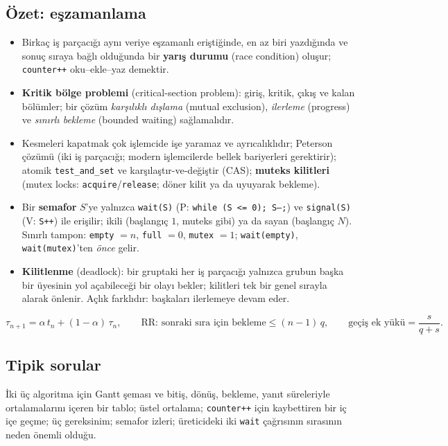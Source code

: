 \documentclass[11pt,a4paper]{article}
\newcommand{\term}[1]{\textbf{\color{mintdeep}#1}}
\begin{document}
\subsection*{Özet: eşzamanlama}
\begin{itemize}
  \item Birkaç iş parçacığı aynı veriye eşzamanlı eriştiğinde, en az biri yazdığında ve sonuç sıraya bağlı olduğunda bir \term{yarış durumu} (race condition) oluşur; \texttt{counter++} oku--ekle--yaz demektir.
  \item \term{Kritik bölge problemi} (critical-section problem): giriş, kritik, çıkış ve kalan bölümler; bir çözüm \emph{karşılıklı dışlama} (mutual exclusion), \emph{ilerleme} (progress) ve \emph{sınırlı bekleme} (bounded waiting) sağlamalıdır.
  \item Kesmeleri kapatmak çok işlemcide işe yaramaz ve ayrıcalıklıdır; Peterson çözümü (iki iş parçacığı; modern işlemcilerde bellek bariyerleri gerektirir); atomik \texttt{test\_and\_set} ve karşılaştır-ve-değiştir (CAS); \term{muteks kilitleri} (mutex locks: \texttt{acquire}/\texttt{release}; döner kilit ya da uyuyarak bekleme).
  \item Bir \term{semafor} $S$'ye yalnızca \texttt{wait(S)} (P: \texttt{while (S <= 0); S--;}) ve \texttt{signal(S)} (V: \texttt{S++}) ile erişilir; ikili (başlangıç $1$, muteks gibi) ya da sayan (başlangıç $N$). Sınırlı tampon: \texttt{empty} $= n$, \texttt{full} $= 0$, \texttt{mutex} $= 1$; \texttt{wait(empty)}, \texttt{wait(mutex)}'ten \emph{önce} gelir.
  \item \term{Kilitlenme} (deadlock): bir gruptaki her iş parçacığı yalnızca grubun başka bir üyesinin yol açabileceği bir olayı bekler; kilitleri tek bir genel sırayla alarak önlenir. Açlık farklıdır: başkaları ilerlemeye devam eder.
\end{itemize}

\begin{keyidea}
\[
\tau_{n+1} = \alpha\, t_n + (1-\alpha)\, \tau_n, \qquad
\text{RR: sonraki sıra için bekleme} \le (n-1)\,q, \qquad
\text{geçiş ek yükü} = \frac{s}{q+s}.
\]
\end{keyidea}

\subsection*{Tipik sorular}
İki üç algoritma için Gantt şeması ve bitiş, dönüş, bekleme, yanıt süreleriyle ortalamalarını içeren bir tablo; üstel ortalama; \texttt{counter++} için kaybettiren bir iç içe geçme; üç gereksinim; semafor izleri; üreticideki iki \texttt{wait} çağrısının sırasının neden önemli olduğu.
\end{document}
